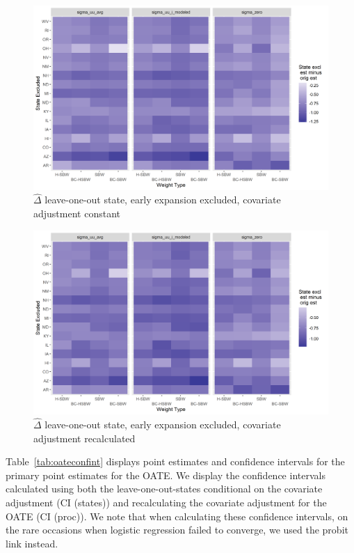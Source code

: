\documentclass{article}
\begin{document}
\begin{appendix}
\begin{figure}[]
\begin{center}
    \caption{$\hat{\Delta}$ leave-one-out state, early expansion excluded, covariate adjustment constant}
    \label{fig:rdiffc2state}
    \includegraphics[scale=0.6]{01_Plots/loostate-repub-sensitivityc2-state-main.png}
\end{center}
\end{figure}

\begin{figure}[]
\begin{center}
    \caption{$\hat{\Delta}$ leave-one-out state, early expansion excluded, covariate adjustment recalculated}
    \label{fig:rdiffc2proc}
    \includegraphics[scale=0.6]{01_Plots/loostate-repub-sensitivityc2-proc-main.png}
\end{center}
\end{figure}

Table~\ref{tab:oateconfint} displays point estimates and confidence intervals for the primary point estimates for the OATE. We display the confidence intervals calculated using both the leave-one-out-states conditional on the covariate adjustment (CI (states)) and recalculating the covariate adjustment for the OATE (CI (proc)). We note that when calculating these confidence intervals, on the rare occasions when logistic regression failed to converge, we used the probit link instead.


\end{appendix}
\end{document}
